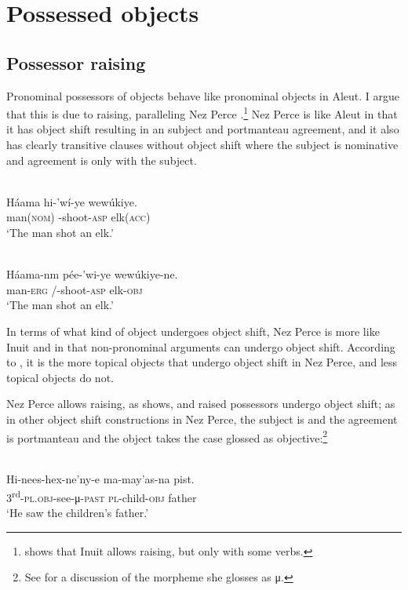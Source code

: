 \documentclass[output=paper]{LSP/langsci}
\begin{document}
\section{Possessed objects}\label{sec:woolford:3} 
\subsection{Possessor raising}

Pronominal possessors of objects behave like pronominal objects in Aleut. I argue that this is due to  raising, paralleling Nez Perce \citep{Deal2013}.\footnote{\citet[71--72]{bittner1994case} shows that Inuit allows  raising, but only with some verbs.} Nez Perce is like Aleut in that it has object shift resulting in an  subject and portmanteau agreement, and it also has clearly transitive clauses without object shift where the subject is nominative and agreement is only with the subject.

 
\ea\label{ex:woolford:33}
\\
\gll Háama    hi-'wí-ye  wewúkiye.  \\
     man(\textsc{nom})  -shoot-\textsc{asp}  elk(\textsc{acc})\\
\glt ‘The man shot an elk.’
\z

\ea\label{ex:woolford:34}
\\
\gll Háama-nm  pée-'wi-ye    wewúkiye-ne.\\
       man-\textsc{erg}  /-shoot-\textsc{asp}  elk-\textsc{obj}   \\
\glt   ‘The man shot an elk.’  
\z

In terms of what kind of object undergoes object shift, Nez Perce is more like Inuit and  in that non-pronominal arguments can undergo object shift. According to \citet{Rude1982,Rude1986}, it is the more topical objects that undergo object shift in Nez Perce, and less topical objects do not.

Nez Perce allows  raising, as \citet{Deal2013} shows, and raised possessors undergo object shift; as in other object shift constructions in Nez Perce, the subject is  and the agreement is portmanteau and the object takes the case glossed as objective:\footnote{See \citet{Deal2013}  for a discussion of the morpheme she glosses as μ.}

\ea\label{ex:woolford:35}
\\
\gll Hi-nees-hex-ne’ny-e   ma-may’as-na   pist.                               \\
     3\textsuperscript{rd}{}-\textsc{pl.obj}-see-μ{}-\textsc{past}  \textsc{pl}-child-\textsc{obj}    father \\
\glt ‘He saw the children’s father.’
\z
\end{document}
